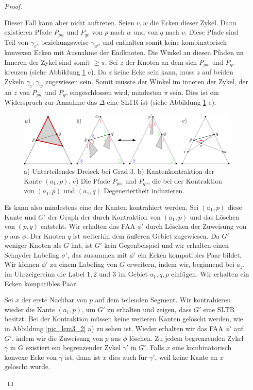\begin{proof}
\begin{description}[leftmargin =0pt, font = \rmfamily ]
Dieser Fall kann aber nicht auftreten. Seien $v,w$ die Ecken dieser Zykel. Dann existieren Pfade $P_{pw}$ und $P_{qv}$ von $p$ nach $w$ und von $q$ nach $v$. Diese Pfade sind Teil von $\gamma_v$, beziehungsweise $\gamma_w$, und enthalten somit keine kombinatorisch konvexen Ecken mit Ausnahme der Endknoten. Die Winkel an diesen Pfaden im Inneren der Zykel sind somit $\geq \pi$. Sei $z$ der Knoten an dem sich $P_{pw}$ und $P_{qv}$ kreuzen (siehe Abbildung \ref{pic_lem3_1} c). Da $z$ keine Ecke sein kann, muss $z$ auf beiden Zykeln $\gamma_v,\gamma_w$  zugewiesen sein. Somit müsste der Winkel im inneren der Zykel, der an $z$ von $P_{pw}$ und $P_{qv}$ eingeschlossen wird, mindesten $\pi$ sein. Dies ist ein Widerspruch zur Annahme das $\Delta$ eine SLTR ist (siehe Abbildung \ref{pic_lem3_1} c).

\begin{figure}
	\centering
	  \includegraphics[width=1\textwidth]{lem3_1.png}
    	\caption{a) Unterteilendes Dreieck bei Grad 3. b) Kantenkontraktion der Kante $(a_1,p)$. c) Die Pfade $P_{pw}$ und $P_{qv}$, die bei der Kontraktion von $(a_1,p)$ und $(a_1,q)$ Degeneriertheit induzieren.}
    	\label{pic_lem3_1}
\end{figure}

Es kann also mindestens eine der Kanten kontrahiert werden. Sei $(a_1,p)$ diese Kante und $G'$ der Graph der durch Kontraktion von $(a_1,p)$ und das Löschen von $(p,q)$ entsteht. Wir erhalten das FAA $\phi'$ durch Löschen der Zuweisung von $p$ aus $\phi$. Der Knoten $q$ ist weiterhin dem äußeren Gebiet zugewiesen. Da $G'$ weniger Knoten als $G$ hat, ist $G'$ kein Gegenbeispiel und wir erhalten einen Schnyder Labeling $\sigma'$, das zusammen mit $\phi'$ ein Ecken kompatibles Paar bildet. Wir können $\phi'$ zu einem Labeling von $G$ erweitern, indem wir, beginnend bei $a_1$, im Uhrzeigersinn die Label $1,2$ und $3$ im Gebiet $a_1,q,p$ einfügen. Wir erhalten ein Ecken kompatibles Paar.

\item[Fall 2:] Sei $x$ der erste Nachbar von $p$ auf dem teilenden Segment. Wir kontrahieren wieder die Kante $(a_1,p)$, um $G'$ zu erhalten und zeigen, dass $G'$ eine SLTR besitzt. Bei der Kontraktion müssen keine weiteren Kanten gelöscht werden, wie in Abbildung \ref{pic_lem3_2} a) zu sehen ist. Wieder erhalten wir das FAA $\phi'$ auf $G'$, indem wir die Zuweisung von $p$ aus $\phi$ löschen. Zu jedem begrenzenden Zykel $\gamma$ in $G$ existiert ein begrenzender Zykel $\gamma'$ in $G'$. Falls $x$ eine kombinatorisch konvexe Ecke von $\gamma$ ist, dann ist $x$ dies auch für $\gamma'$, weil keine Kante an $x$ gelöscht wurde.


\end{description}
\end{proof}
